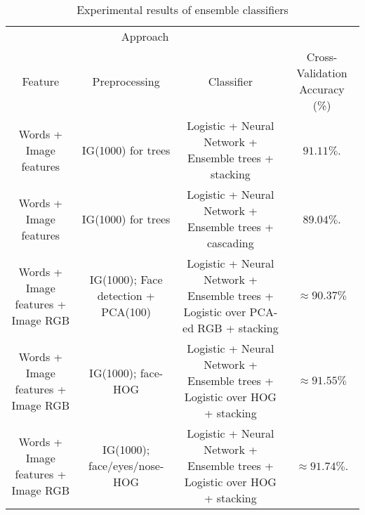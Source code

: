 \begin{table}[h!]
\centering
\begin{tabular}{ c c c c}
\hline
\multicolumn{3}{c}{Approach} \\
\cline{1-3}
Feature & Preprocessing & Classifier & Cross-Validation Accuracy (\%) \\
\hline
Words + Image features & IG(1000) for trees & Logistic + Neural Network + Ensemble trees + stacking & $91.11\%$. \\
Words + Image features & IG(1000) for trees & Logistic + Neural Network + Ensemble trees + cascading & $89.04\%$. \\
Words + Image features + Image RGB & IG(1000); Face detection + PCA(100) & Logistic + Neural Network + Ensemble trees + Logistic over PCA-ed RGB + stacking & $\approx 90.37\%$ \\
Words + Image features + Image RGB & IG(1000); face-HOG & Logistic + Neural Network + Ensemble trees + Logistic over HOG + stacking & $\approx 91.55\%$ \\
Words + Image features + Image RGB & IG(1000); face/eyes/nose-HOG & Logistic + Neural Network + Ensemble trees + Logistic over HOG + stacking & $\approx 91.74\%$. 
\end{tabular}
\caption{Experimental results of ensemble classifiers}
\label{Table 2}
\end{table}



